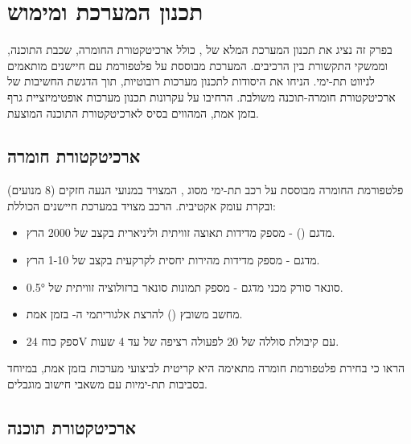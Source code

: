 
\section{תכנון המערכת ומימוש}
\label{sec:system_design}

בפרק זה נציג את תכנון המערכת המלא של , כולל ארכיטקטורת החומרה, שכבת התוכנה, וממשקי התקשורת בין הרכיבים. המערכת מבוססת על פלטפורמת  עם חיישנים מותאמים לניווט תת-ימי. \citet{Thrun2005ProbRobotics} הניחו את היסודות לתכנון מערכות  רובוטיות, תוך הדגשת החשיבות של ארכיטקטורת חומרה-תוכנה משולבת. \citet{Grisetti2010g2o} הרחיבו על עקרונות תכנון מערכות אופטימיזציית גרף בזמן אמת, המהווים בסיס לארכיטקטורת התוכנה המוצעת.

\subsection{ארכיטקטורת חומרה}
\label{sec:hardware_architecture}

פלטפורמת החומרה מבוססת על רכב תת-ימי מסוג , המצויד במנועי הנעה חזקים (8 מנועים) ובקרת עומק אקטיבית. הרכב מצויד במערכת חיישנים הכוללת:

\begin{itemize}
    \item {} מדגם  () - מספק מדידות תאוצה זוויתית וליניארית בקצב של 2000 הרץ.
    \item {} מדגם  - מספק מדידות מהירות יחסית לקרקעית בקצב של 1-10 הרץ.
    \item סונאר סורק מכני מדגם  - מספק תמונות סונאר ברזולוציה זוויתית של 0.5°.
    \item מחשב משובץ  () להרצת אלגוריתמי ה- בזמן אמת.
    \item ספק כוח 24V עם קיבולת סוללה של 20  לפעולה רציפה של עד 4 שעות.
\end{itemize}

\citet{Kaess2012} הראו כי בחירת פלטפורמת חומרה מתאימה היא קריטית לביצועי מערכות  בזמן אמת, במיוחד בסביבות תת-ימיות עם משאבי חישוב מוגבלים.

\subsection{ארכיטקטורת תוכנה}
\label{sec:software_architecture}

